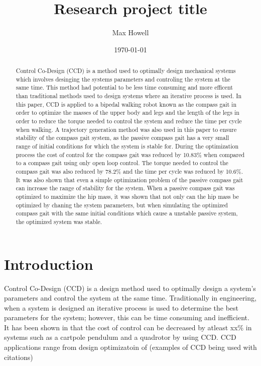 \documentclass{./springer/svjour3}
\title{Research project title}
\author{Max Howell}
\institute{University Of Tennessee Knoxville$^*$ ($^*$corresponding author),
          \email{mhowel30@vols.utk.edu} \\
        \\
          \at MABE, University of Tennessee, Knoxville,
          \at Nathan W. Dougherty Engineering Building, 1512 Middle Dr, Knoxville, TN 37916\\
}
\date{\today}
\begin{document}



\maketitle{}

\begin{abstract}

Control Co-Design (CCD) is a method used to optimally design mechanical systems which involves desinging the systems parameters and controling the system at the same time. This method 
had potential to be less time consuming and more efficent than traditional methods used to design systems where an iterative process is used. In this paper, CCD is applied to a 
bipedal walking robot known as the compass gait in order to optimize the masses of the upper body and legs and the length of the legs in order to reduce the torque needed to control 
the system and reduce the time per cycle when walking. 
A trajectory generation method was also used in this paper to ensure stability of the compass gait system, as the passive compass gait has a very small range of initial conditions for 
which the system is stable for.
During the optimization process the cost of control for the compass gait was reduced by 10.83$\%$
when compared to a compass gait using only open loop control. The torque needed to control the compass gait was also reduced by 78.2$\%$ and the time per cycle was reduced by 10.6$\%$.
It was also shown that even a simple optimization problem of the passive compass gait can increase the range of stability for the system. When a passive compass gait was optimized to maximize the hip 
mass, it was shown that not only can the hip mass be optimized by chaning the system parameters, but when simulating the optimized compass gait with 
the same initial conditions which cause a unstable passive system, the optimized system was stable.

\end{abstract}

\section{Introduction}
Control Co-Design (CCD) is a design method used to optimally design a system's parameters and control the system at the same time. Traditionally in engineering,
when a system is designed an iterative process is used to determine the best parameters for the system; however, this can be time consuming and inefficient. 
It has been shown in \cite{} that the cost of control can be decreased by atleast xx\% in systems such as a cartpole pendulum and a quadrotor by using CCD. CCD applications range
from design optimizatoin of (examples of CCD being used with citations)
\end{document}
